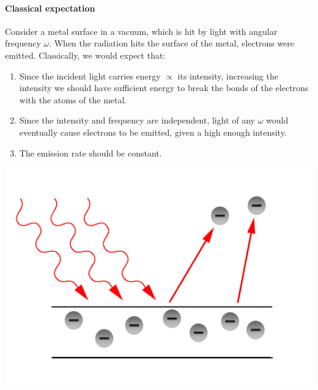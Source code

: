 \documentclass[a4paper,11pt]{article}
\begin{document}
\paragraph{Classical expectation}
Consider a metal surface in a vacuum, which is hit by light with angular frequency \( \omega \).
When the radiation hits the surface of the metal, electrons were emitted.
Classically, we would expect that:
\begin{enumerate}
	\item Since the incident light carries energy $ \propto $ its intensity, increasing the intensity we should have sufficient energy to break the bonds of the electrons with the atoms of the metal.
	\item Since the intensity and frequency are independent, light of any \( \omega \) would eventually cause electrons to be emitted, given a high enough intensity.
	\item The emission rate should be constant.
\end{enumerate}
\begin{center}
    \includegraphics[scale=0.5]{qm2.png}
\end{center}
\end{document}
